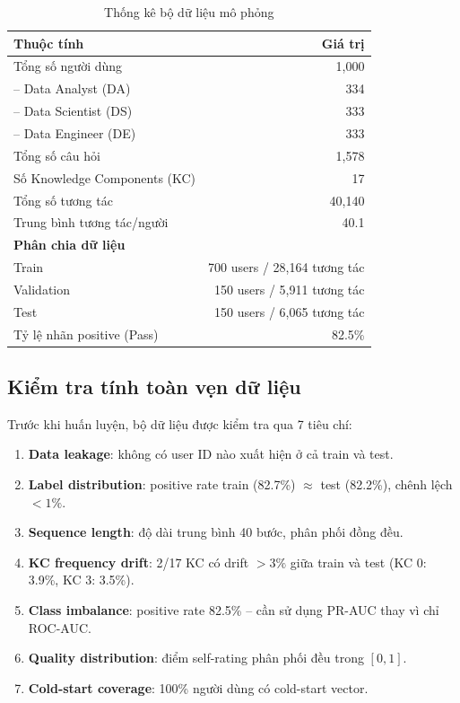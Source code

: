 \documentclass[12pt, a4paper]{report}
\begin{document}
\begin{table}[H]
  \centering
  \caption{Thống kê bộ dữ liệu mô phỏng}
  \label{tab:dataset}
  \begin{tabular}{lr}
    \toprule
    \textbf{Thuộc tính} & \textbf{Giá trị} \\
    \midrule
    Tổng số người dùng & 1{,}000 \\
    \quad -- Data Analyst (DA) & 334 \\
    \quad -- Data Scientist (DS) & 333 \\
    \quad -- Data Engineer (DE) & 333 \\
    Tổng số câu hỏi & 1{,}578 \\
    Số Knowledge Components (KC) & 17 \\
    Tổng số tương tác & 40{,}140 \\
    Trung bình tương tác/người & 40.1 \\
    \midrule
    \textbf{Phân chia dữ liệu} & \\
    \quad Train & 700 users / 28{,}164 tương tác \\
    \quad Validation & 150 users / 5{,}911 tương tác \\
    \quad Test & 150 users / 6{,}065 tương tác \\
    \midrule
    Tỷ lệ nhãn positive (Pass) & 82.5\% \\
    \bottomrule
  \end{tabular}
\end{table}

\subsection{Kiểm tra tính toàn vẹn dữ liệu}

Trước khi huấn luyện, bộ dữ liệu được kiểm tra qua 7 tiêu chí:
\begin{enumerate}
  \item \textbf{Data leakage}: không có user ID nào xuất hiện ở cả train và test.
  \item \textbf{Label distribution}: positive rate train (82.7\%) $\approx$ test (82.2\%), chênh lệch $< 1\%$.
  \item \textbf{Sequence length}: độ dài trung bình 40 bước, phân phối đồng đều.
  \item \textbf{KC frequency drift}: 2/17 KC có drift $> 3\%$ giữa train và test (KC 0: 3.9\%, KC 3: 3.5\%).
  \item \textbf{Class imbalance}: positive rate 82.5\% -- cần sử dụng PR-AUC thay vì chỉ ROC-AUC.
  \item \textbf{Quality distribution}: điểm self-rating phân phối đều trong $[0, 1]$.
  \item \textbf{Cold-start coverage}: 100\% người dùng có cold-start vector.
\end{enumerate}
\end{document}
